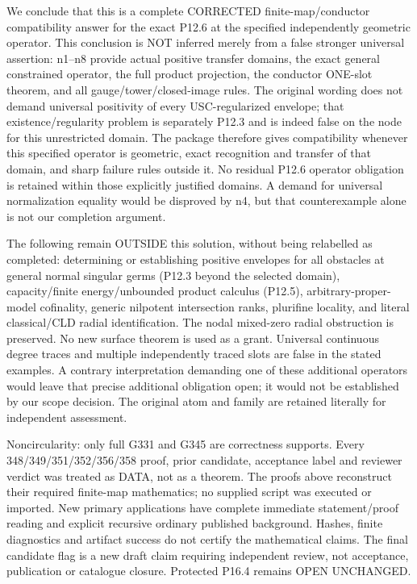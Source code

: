 We conclude that this is a complete CORRECTED finite-map/conductor compatibility answer for the exact P12.6 at the specified independently geometric operator. This conclusion is NOT inferred merely from a false stronger universal assertion: n1--n8 provide actual positive transfer domains, the exact general constrained operator, the full product projection, the conductor ONE-slot theorem, and all gauge/tower/closed-image rules. The original wording does not demand universal positivity of every USC-regularized envelope; that existence/regularity problem is separately P12.3 and is indeed false on the node for this unrestricted domain. The package therefore gives compatibility whenever this specified operator is geometric, exact recognition and transfer of that domain, and sharp failure rules outside it. No residual P12.6 operator obligation is retained within those explicitly justified domains. A demand for universal normalization equality would be disproved by n4, but that counterexample alone is not our completion argument.

The following remain OUTSIDE this solution, without being relabelled as completed: determining or establishing positive envelopes for all obstacles at general normal singular germs (P12.3 beyond the selected domain), capacity/finite energy/unbounded product calculus (P12.5), arbitrary-proper-model cofinality, generic nilpotent intersection ranks, plurifine locality, and literal classical/CLD radial identification. The nodal mixed-zero radial obstruction is preserved. No new surface theorem is used as a grant. Universal continuous degree traces and multiple independently traced slots are false in the stated examples. A contrary interpretation demanding one of these additional operators would leave that precise additional obligation open; it would not be established by our scope decision. The original atom and family are retained literally for independent assessment.

Noncircularity: only full G331 and G345 are correctness supports. Every 348/349/351/352/356/358 proof, prior candidate, acceptance label and reviewer verdict was treated as DATA, not as a theorem. The proofs above reconstruct their required finite-map mathematics; no supplied script was executed or imported. New primary applications have complete immediate statement/proof reading and explicit recursive ordinary published background. Hashes, finite diagnostics and artifact success do not certify the mathematical claims. The final candidate flag is a new draft claim requiring independent review, not acceptance, publication or catalogue closure. Protected P16.4 remains OPEN UNCHANGED.
